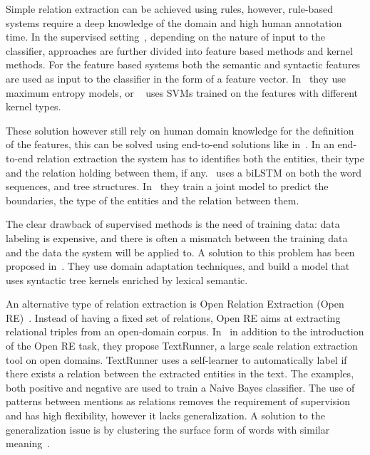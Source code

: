 Simple relation extraction can be achieved using rules, however, rule-based systems require a deep knowledge of the domain and high human annotation time. In the supervised setting~\citep{bach2007review}, depending on the nature of input to the classifier, approaches are further divided into feature based methods and kernel methods. For the feature based systems both the semantic and syntactic features are used as input to the classifier in the form of a feature vector. In~\cite{Kambhatla2004extraction} they use maximum entropy models, or ~\citep{zhao-grishman-2005-extracting, zhou-etal-2005-exploring} uses SVMs trained on the features with different kernel types.

These solution however still rely on human domain knowledge for the definition of the features, this can be solved using end-to-end solutions like in~\citep{miwa-bansal-2016-end, pawar-etal-2017-end}. In an end-to-end relation extraction the system has to identifies both the entities, their type and the relation holding between them, if any.~\cite{miwa-bansal-2016-end} uses a biLSTM on both the word sequences, and tree structures. In~\cite{pawar-etal-2017-end} they train a joint model to predict the boundaries, the type of the entities and the relation between them. 

The clear drawback of supervised methods is the need of training data: data labeling is expensive, and there is often a mismatch between the training data and the data the system will be applied to. A solution to this problem has been proposed in~\citep{plank-moschitti-2013-embedding}. They use domain adaptation techniques, and build a model that uses syntactic tree kernels enriched by lexical semantic.

An alternative type of relation extraction is Open Relation Extraction (Open RE)~\citep{banko2007openre, banko-etzioni-2008-tradeoffs}. Instead of having a fixed set of relations, Open RE aims at extracting relational triples from an open-domain corpus.  In~\citep{banko2007openre} in addition to the introduction of the Open RE task, they propose TextRunner, a large scale relation extraction tool on open domains. TextRunner uses a self-learner to automatically label if there exists a relation between the extracted entities in the text. The examples, both positive and negative are used to train a Naive Bayes classifier. The use of patterns between mentions as relations removes the requirement of supervision and has high flexibility, however it lacks generalization. A solution to the generalization issue is by clustering the surface form of words with similar meaning~\citep{yao-etal-2011-structured}.

